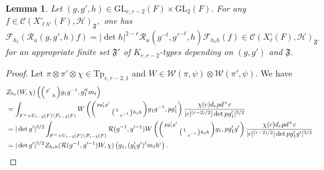 \documentclass[12pt]{amsart}
\newtheorem{lem}[thm]{Lemma}
\theoremstyle{remark}
\numberwithin{equation}{section}
\newcommand{\GL}{\mathrm{GL}}
\theoremstyle{definition}
\newenvironment{psmatrix}
  {\left(\begin{smallmatrix}}
  {\end{smallmatrix}\right)}
\numberwithin{equation}{subsection}
\begin{document}
\begin{lem} \label{lem:FT}
Let $
(g,g',h) \in \GL_{r,r-2}(F) \times \mathrm{GL}_2(F).
$
For any $f \in \mathcal{C}(X^{\circ}_{\ell h^{\iota}}(F),\mathcal{H})_{\mathfrak{F}},$ one has 
$$
\mathcal{F}_{h_\ell }(\mathcal{R}_u(g,g',h)f)=|\det h|^{2-r}
\mathcal{R}_u(g^{-t},g'^{-t},h )  \mathcal{F}_{h_\ell h }(f) \in \mathcal{C}(X^{\circ}_{\ell}(F),\mathcal{H})_{\mathfrak{F}'}
$$
for an appropriate finite set $\mathfrak{F}'$  of $K_{r,r-2}$-types depending on $(g,g')$ and $\mathfrak{F}.$
\end{lem}

\begin{proof} Let $\pi \otimes \pi'\otimes \chi\in \mathrm{Tp}_{r,r-2,1}$ and $W \in \mathcal{W}(\pi,\psi) \otimes \mathcal{W}(\pi',\psi).$ We have
\begin{align*}
    &Z_{h_\ell}(W,\chi)\left(\begin{psmatrix}
        g' & \\
        & h\end{psmatrix}g_1g^{-1},g_1'^tm_\ell\right)\\
        &=\int_{F^\times\times U_{r-2}(F)\backslash \mathcal{P}_{r-2}(F)} W\left(\begin{psmatrix}
        pg_1'g' & \\
           & \begin{psmatrix} 1 & \\ & c^{-1}\end{psmatrix}h_\ell h
\end{psmatrix}g_1g^{-1},pg_1'\right)\frac{\chi(c)d_rpd^\times c}{|c|^{(r-2)/2}|\det pg_1'|^{3/2}}\\
        &=|\det g'|^{3/2}\int_{F^\times\times U_{r-2}(F)\backslash \mathcal{P}_{r-2}(F)} \mathcal{R}(g^{-1},g'^{-1})W\left(\begin{psmatrix}
        pg_1'g' & \\
           & \begin{psmatrix} 1 & \\ & c^{-1}\end{psmatrix}h_\ell h
\end{psmatrix}g_1,pg_1'g'\right)\frac{\chi(c)d_rpd^\times c}{|c|^{(r-2)/2}|\det pg_1'g'|^{3/2}}\\
        &=|\det g'|^{3/2}Z_{h_\ell h}(\mathcal{R}(g^{-1},g'^{-1}) W,\chi)\left(g_1,(g_1'g')^tm_\ell h^\iota\right).
\end{align*}


\end{proof}
\end{document}
